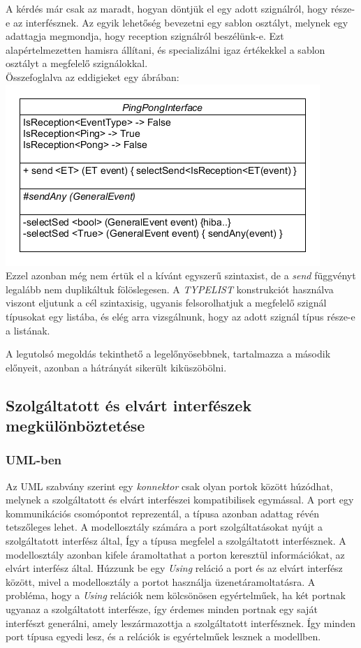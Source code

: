 \documentclass[a4paper,12pt]{report}
\begin{document}
\begin{enumerate}
A kérdés már csak az maradt, hogyan döntjük el egy adott szignálról, hogy része-e az interfésznek. Az egyik lehetőség bevezetni egy sablon osztályt, melynek egy adattagja megmondja, hogy reception szignálról beszélünk-e. Ezt alapértelmezetten hamisra állítani, és specializálni igaz értékekkel a sablon osztályt a megfelelő szignálokkal. \\
Összefoglalva az eddigieket egy ábrában: \\
\includegraphics[scale=0.8]{better_inf.png} \\
Ezzel azonban még nem értük el a kívánt egyszerű szintaxist, de a \textit{send} függvényt legalább nem duplikáltuk fölöslegesen. A \textit{TYPELIST} \cite{typelist} konstrukciót használva viszont eljutunk a cél szintaxisig, ugyanis felsorolhatjuk a megfelelő szignál típusokat egy listába, és elég arra vizsgálnunk, hogy az adott szignál típus része-e a listának.
\end{enumerate}

A legutolsó megoldás tekinthető a legelőnyösebbnek, tartalmazza a második előnyeit, azonban a hátrányát sikerült kiküszöbölni.

\subsection{Szolgáltatott és elvárt interfészek megkülönböztetése}
\subsubsection{UML-ben}
Az UML szabvány szerint egy \textit{konnektor} csak olyan portok között
húzódhat, melynek a szolgáltatott és elvárt interfészei kompatibilisek egymással.
A port egy kommunikációs csomópontot reprezentál, a típusa azonban adattag révén tetszőleges lehet.
A modellosztály számára a port szolgáltatásokat nyújt a szolgáltatott interfész által, Így a típusa megfelel a szolgáltatott interfésznek.
A modellosztály azonban kifele áramoltathat a porton keresztül információkat, az elvárt interfész által.
Húzzunk be egy \textit{Using} reláció a port és az elvárt interfész között, mivel a modellosztály a portot használja üzenetáramoltatásra.
A probléma, hogy a \textit{Using} relációk nem kölcsönösen egyértelműek, ha két portnak ugyanaz a szolgáltatott interfésze, így
érdemes minden portnak egy saját interfészt generálni, amely leszármazottja a szolgáltatott interfésznek. Így minden port típusa egyedi lesz, és a relációk is egyértelműek lesznek a modellben.
\end{document}
